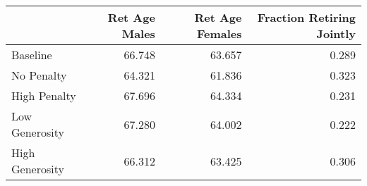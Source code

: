 \begin{tabular}{lrrr}
\toprule
{} & Ret Age Males & Ret Age Females & Fraction Retiring Jointly \\
\midrule
Baseline        &        66.748 &          63.657 &                     0.289 \\
No Penalty      &        64.321 &          61.836 &                     0.323 \\
High Penalty    &        67.696 &          64.334 &                     0.231 \\
Low Generosity  &        67.280 &          64.002 &                     0.222 \\
High Generosity &        66.312 &          63.425 &                     0.306 \\
\bottomrule
\end{tabular}
